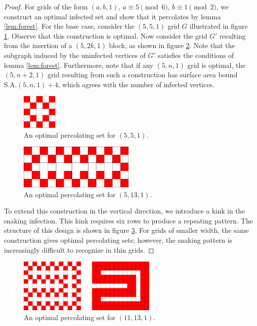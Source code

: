 \begin{proof}
For grids of the form $(a,b,1)$, $a \equiv 5 \pmod 6$, $b \equiv 1 \pmod 2$, we construct an optimal infected set and show that it percolates by lemma \ref{lem:forest}. For the base case, consider the $(5,5,1)$ grid $G$ illustrated in figure \ref{fig:5x5x1}. Observe that this construction is optimal. Now consider the grid $G'$ resulting from the insertion of a $(5, 2k, 1)$ block, as shown in figure \ref{fig:5x13x1}. Note that the subgraph induced by the uninfected vertices of $G'$ satisfies the conditions of lemma \ref{lem:forest}. Furthermore, note that if any $(5, n, 1)$ grid is optimal, the $(5,n+2,1)$ grid resulting from such a construction has surface area bound $\text{S.A.}(5,n,1) + 4$, which agrees with the number of infected vertices.

\begin{figure}[]
\centering
\includegraphics[width=0.15\textwidth]{figures/4/5x5x1.pdf}
\caption{An optimal percolating set for $(5,5,1)$.}
\label{fig:5x5x1}
\end{figure} 

\begin{figure}[]
\centering
\includegraphics[width=0.5\textwidth]{figures/4/5x13x1.pdf}
\caption{An optimal percolating set for $(5,13,1)$.}
\label{fig:5x13x1}
\end{figure} 

To extend this construction in the vertical direction, we introduce a kink in the snaking infection. This kink requires six rows to produce a repeating pattern. The structure of this design is shown in figure \ref{fig:11x13x1}. For grids of smaller width, the same construction gives optimal percolating sets; however, the snaking pattern is increasingly difficult to recognize in thin grids.
\end{proof}

\begin{figure}[]
\centering
\includegraphics[width=0.6\textwidth]{figures/4/11x13x1.pdf}
\caption{An optimal percolating set for $(11,13,1)$.}
\label{fig:11x13x1}
\end{figure} 

